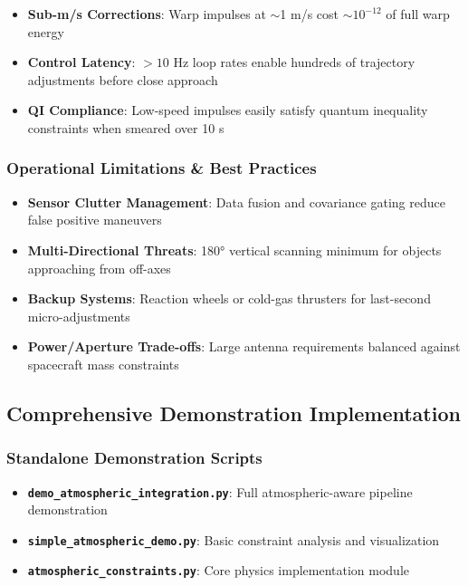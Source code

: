 \documentclass[11pt]{article}
\begin{document}
\begin{itemize}
\item \textbf{Sub-m/s Corrections}: Warp impulses at $\sim$1 m/s cost $\sim 10^{-12}$ of full warp energy
\item \textbf{Control Latency}: $>10$ Hz loop rates enable hundreds of trajectory adjustments before close approach
\item \textbf{QI Compliance}: Low-speed impulses easily satisfy quantum inequality constraints when smeared over 10 s
\end{itemize}

\subsubsection{Operational Limitations \& Best Practices}
\begin{itemize}
\item \textbf{Sensor Clutter Management}: Data fusion and covariance gating reduce false positive maneuvers
\item \textbf{Multi-Directional Threats}: 180° vertical scanning minimum for objects approaching from off-axes
\item \textbf{Backup Systems}: Reaction wheels or cold-gas thrusters for last-second micro-adjustments
\item \textbf{Power/Aperture Trade-offs}: Large antenna requirements balanced against spacecraft mass constraints
\end{itemize}

\subsection{Comprehensive Demonstration Implementation}

\subsubsection{Standalone Demonstration Scripts}
\begin{itemize}
\item \textbf{\texttt{demo\_atmospheric\_integration.py}}: Full atmospheric-aware pipeline demonstration
\item \textbf{\texttt{simple\_atmospheric\_demo.py}}: Basic constraint analysis and visualization
\item \textbf{\texttt{atmospheric\_constraints.py}}: Core physics implementation module
\end{itemize}
\end{document}
